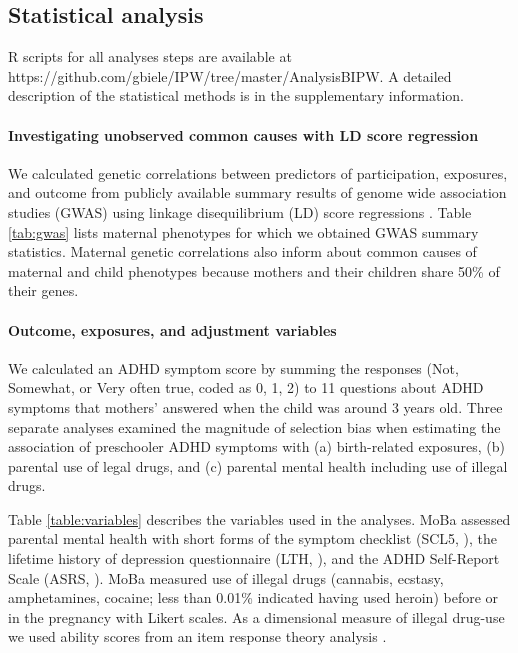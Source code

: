 \documentclass[12pt]{article}
\begin{document}
\subsection{Statistical analysis}
R scripts for all analyses steps are available at {\footnotesize https://github.com/gbiele/IPW/tree/master/AnalysisBIPW}. A detailed description of the statistical methods is in the supplementary information.

\paragraph{Investigating unobserved common causes with LD score regression} We calculated genetic correlations between predictors of participation, exposures, and outcome from publicly available summary results of genome wide association studies (GWAS) using linkage disequilibrium (LD) score regressions \cite{Bulik-Sullivan2015-er}. Table \ref{tab:gwas} lists maternal phenotypes for which we obtained GWAS summary statistics. Maternal genetic correlations also inform about common causes of maternal and child phenotypes because mothers and their children share 50\% of their genes.

\paragraph{Outcome, exposures, and adjustment variables} We calculated an ADHD symptom score by summing the responses (Not, Somewhat, or Very often true, coded as 0, 1, 2) to 11 questions about ADHD symptoms that mothers' answered when the child was around 3 years old. Three separate analyses examined the magnitude of selection bias when estimating the association of preschooler ADHD symptoms with (a) birth-related exposures, (b) parental use of legal drugs, and (c) parental mental health including use of illegal drugs. 

Table \ref{table:variables} describes the variables used in the analyses. MoBa assessed parental mental health with short forms of the symptom checklist (SCL5, \cite{Tambs1993-ch}), the lifetime history of depression questionnaire (LTH, \cite{Kendler1993-pf}), and the ADHD Self-Report Scale (ASRS, \cite{Kessler2007-et}). MoBa measured use of illegal drugs (cannabis, ecstasy, amphetamines, cocaine; less than 0.01\% indicated  having used heroin) before or in the pregnancy with Likert scales. As a dimensional measure of illegal drug-use we used ability scores from an item response theory analysis \cite{Rizopoulos2006-bc}. 
\end{document}
